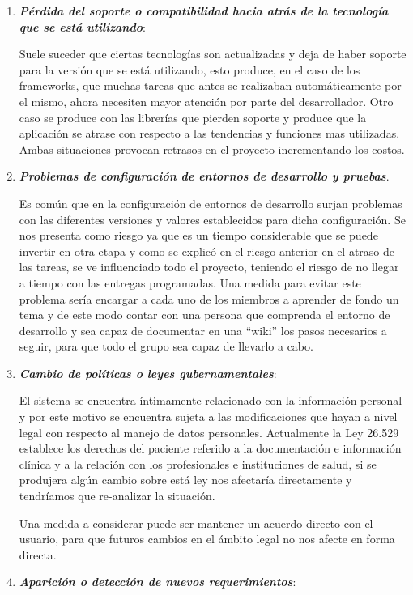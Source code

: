 \begin{enumerate}
\item \textbf{\textit{Pérdida del soporte o compatibilidad hacia atrás de la tecnología que se está utilizando}}:

Suele suceder que ciertas tecnologías son actualizadas y deja de haber soporte para la versión que se está utilizando, esto produce, en el caso de los frameworks, que muchas  tareas que antes se realizaban automáticamente por el mismo, ahora necesiten mayor atención por parte del desarrollador. Otro caso se produce con las librerías que pierden soporte y produce que la aplicación se atrase con respecto a las tendencias y funciones mas utilizadas. Ambas situaciones provocan retrasos en el proyecto incrementando los costos. 

\item \textbf{\textit{Problemas de configuración de entornos de desarrollo y pruebas}}.

Es común que en la configuración de  entornos de desarrollo surjan problemas con las diferentes versiones y valores establecidos para dicha configuración. Se nos presenta como riesgo ya que es un tiempo considerable que se puede invertir en otra etapa y como se explicó en el riesgo anterior en el atraso de las tareas, se ve influenciado todo el proyecto, teniendo el riesgo de no llegar a tiempo con las entregas programadas. Una medida para evitar este problema sería encargar a cada uno de los miembros a aprender de fondo un tema y de este modo contar con una persona que comprenda el entorno de desarrollo y sea capaz de documentar en una ``wiki'' los pasos necesarios a seguir, para que todo el grupo sea capaz de llevarlo a cabo.

\item \textbf{\textit{Cambio de políticas o leyes gubernamentales}}:

El sistema se encuentra íntimamente relacionado con la información personal y por este motivo se encuentra sujeta a las modificaciones que hayan a nivel legal con respecto al manejo de datos personales. Actualmente  la Ley 26.529 establece los derechos del paciente referido a la documentación e información clínica y a la relación con los profesionales e instituciones de salud, si se produjera algún cambio sobre está ley nos afectaría directamente y tendríamos que re-analizar la situación.

Una medida a considerar puede ser mantener un acuerdo directo con el usuario, para que futuros cambios en el ámbito legal no nos afecte en forma directa.

\item \textbf{\textit{Aparición o detección de nuevos requerimientos}}:


\end{enumerate}
